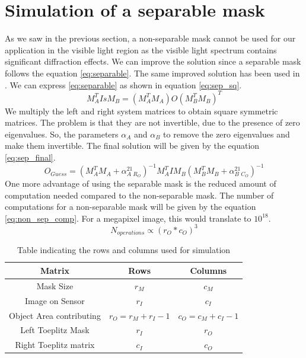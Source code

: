     
\section{Simulation of a separable mask}
As we saw in the previous section, a non-separable mask cannot be used for our application in the visible light region as the visible light spectrum contains significant diffraction effects. We can improve the solution since a separable mask follows the equation \ref{eq:separable}. The same improved solution has been used in \cite{Toeplitz}. We can express \ref{eq:separable} as shown in equation \ref{eq:sep_sq}.
\begin{equation}
M_{A}^TIsM_{B} = (M_{A}^TM_{A})O(M_{B}^TM_B)^T 
\label{eq:sep_sq}
\end{equation} 
We multiply the left and right system matrices to obtain square symmetric matrices. The problem is that they are not invertible, due to the presence of zero eigenvalues. So, the parameters $\alpha_A$ and $\alpha_B$ to remove the zero eigenvalues and make them invertible. The final solution will be given by the equation \ref{eq:sep_final}.
\begin{equation}
O_{Guess} = (M_{A}^TM_A + \alpha_{A}^21_{R_{O}})^{-1}M_{A}^TIM_{B}(M_{B}^TM_B + \alpha_{B}^21_{C_{O}})^{-1}
\label{eq:sep_final}
\end{equation}
One more advantage of using the separable mask is the reduced amount of computation needed compared to the non-separable mask. The number of computations for a non-separable mask will be given by the equation \ref{eq:non_sep_comp}. For a megapixel image, this would translate to $10^{18}$.
\begin{equation}
N_{operations} \propto (r_O*c_O)^3
\label{eq:non_sep_comp}
\end{equation}
\begin{table}
\label{tbl:comp_sep}
\caption{Table indicating the rows and columns used for simulation}
\begin{center}
\begin{tabular}{ |c|c|c| }
\hline
Matrix & Rows & Columns \\
\hline
Mask Size & $r_M$ & $c_M$\\
\hline
Image on Sensor & $r_I$ & $c_I$\\
\hline
Object Area contributing &  $r_O = r_M + r_I - 1$ & $c_O = c_M + c_I - 1$\\
\hline
Left Toeplitz Mask & $r_{I}$ & $r_{O}$\\
\hline
Right Toeplitz matrix & $c_{I}$ & $c_{O}$\\
\hline
\end{tabular}
\end{center}
\end{table}



